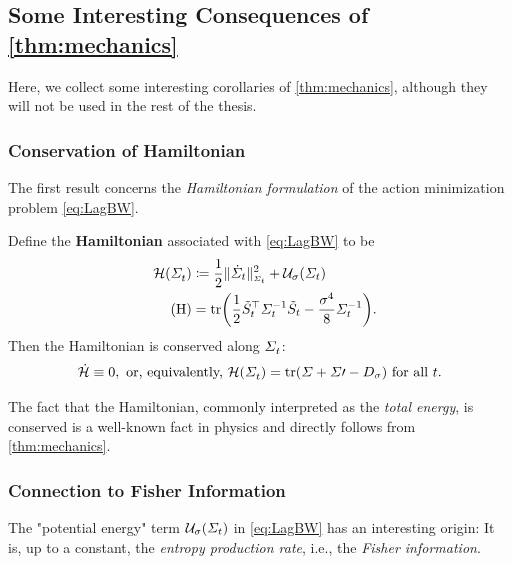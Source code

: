 \subsection{Some Interesting Consequences of \cref{thm:mechanics}}
\label{sec:interesting}

Here, we collect some interesting corollaries of \cref{thm:mechanics}, although they will not be used in the rest of the thesis.

\subsubsection{Conservation of Hamiltonian}
The first result concerns the \emph{Hamiltonian formulation} of the action minimization problem \eqref{eq:LagBW}. 
 
\newcommand{\hambase}{ \mathcal{H} }
\newcommand{\ham}[1][\Sigmasol]{ \hambase\parens*{#1} }

\begin{corollary}
Define the \textbf{Hamiltonian} associated with \eqref{eq:LagBW} to be
\begin{align}
\nn
\ham &\defeq \kenergyBW + \penergyBW \\
\label{eq:HamBW}
\tag{H}
&=  \tr  \parens*{\frac{1}{2} \Ht^\top\Sigmasolinv\Ht - \frac{\sdev^4}{8} \Sigmasolinv}.
\end{align}Then the Hamiltonian is conserved along $\Sigma^{}_{ t }$: 
\begin{align}
\dot{\hambase} \equiv 0,  \text{ or, equivalently, }  \ham = \tr \parens*{\Sigma + \Sigma\prime - \D} \textup{ for all $\ctime$.}
\end{align}
\end{corollary}

The fact that the Hamiltonian, commonly interpreted as the \emph{total energy}, is conserved is a well-known fact in physics \citep{villani2009optimal} and directly follows from \cref{thm:mechanics}.

\subsubsection{Connection to Fisher Information}

The "potential energy" term $\penergyBW$ in \eqref{eq:LagBW} has an interesting origin: It is, up to a constant, the \emph{entropy production rate}, i.e., the \emph{Fisher information}.


